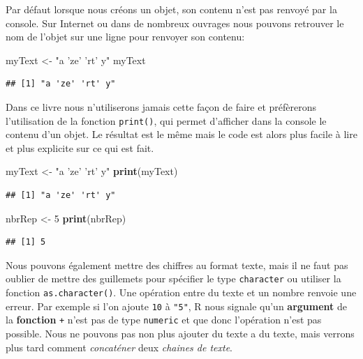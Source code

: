 \documentclass[]{book}
\newenvironment{Shaded}{\begin{snugshade}}{\end{snugshade}}
\newcommand{\KeywordTok}[1]{\textcolor[rgb]{0.13,0.29,0.53}{\textbf{#1}}}
\newcommand{\DecValTok}[1]{\textcolor[rgb]{0.00,0.00,0.81}{#1}}
\newcommand{\StringTok}[1]{\textcolor[rgb]{0.31,0.60,0.02}{#1}}
\newcommand{\NormalTok}[1]{#1}
\begin{document}
Par défaut lorsque nous créons un objet, son contenu n'est pas renvoyé
par la console. Sur Internet ou dans de nombreux ouvrages nous pouvons
retrouver le nom de l'objet sur une ligne pour renvoyer son contenu:

\begin{Shaded}
\begin{Highlighting}[]
\NormalTok{myText <-}\StringTok{ "a 'ze' 'rt' y"}
\NormalTok{myText}
\end{Highlighting}
\end{Shaded}

\begin{verbatim}
## [1] "a 'ze' 'rt' y"
\end{verbatim}

Dans ce livre nous n'utiliserons jamais cette façon de faire et
préfèrerons l'utilisation de la fonction \texttt{print()}, qui permet
d'afficher dans la console le contenu d'un objet. Le résultat est le
même mais le code est alors plus facile à lire et plus explicite sur ce
qui est fait.

\begin{Shaded}
\begin{Highlighting}[]
\NormalTok{myText <-}\StringTok{ "a 'ze' 'rt' y"}
\KeywordTok{print}\NormalTok{(myText)}
\end{Highlighting}
\end{Shaded}

\begin{verbatim}
## [1] "a 'ze' 'rt' y"
\end{verbatim}

\begin{Shaded}
\begin{Highlighting}[]
\NormalTok{nbrRep <-}\StringTok{ }\DecValTok{5}
\KeywordTok{print}\NormalTok{(nbrRep)}
\end{Highlighting}
\end{Shaded}

\begin{verbatim}
## [1] 5
\end{verbatim}

Nous pouvons également mettre des chiffres au format texte, mais il ne
faut pas oublier de mettre des guillemets pour spécifier le type
\texttt{character} ou utiliser la fonction \texttt{as.character()}. Une
opération entre du texte et un nombre renvoie une erreur. Par exemple si
l'on ajoute \texttt{10} à \texttt{"5"}, R nous signale qu'un
\textbf{argument} de la \textbf{fonction} \texttt{+} n'est pas de type
\texttt{numeric} et que donc l'opération n'est pas possible. Nous ne
pouvons pas non plus ajouter du texte a du texte, mais verrons plus tard
comment \emph{concaténer} deux \emph{chaines de texte}.
\end{document}
